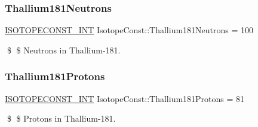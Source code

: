 \subsubsection{\texorpdfstring{Thallium181\+Neutrons}{Thallium181Neutrons}}
{\footnotesize\ttfamily \mbox{\hyperlink{group___isotope_const-_macros_ga5f18360b3e99483a35c32d789e62621c}{I\+S\+O\+T\+O\+P\+E\+C\+O\+N\+S\+T\+\_\+\+I\+NT}} Isotope\+Const\+::\+Thallium181\+Neutrons = 100}

\$ \$ Neutrons in Thallium-\/181. \mbox{\label{group___isotope_const-_thallium-_tl181_ga7ef735318fa518055c70209bc955fa98}} 
\subsubsection{\texorpdfstring{Thallium181\+Protons}{Thallium181Protons}}
{\footnotesize\ttfamily \mbox{\hyperlink{group___isotope_const-_macros_ga5f18360b3e99483a35c32d789e62621c}{I\+S\+O\+T\+O\+P\+E\+C\+O\+N\+S\+T\+\_\+\+I\+NT}} Isotope\+Const\+::\+Thallium181\+Protons = 81}

\$ \$ Protons in Thallium-\/181. 